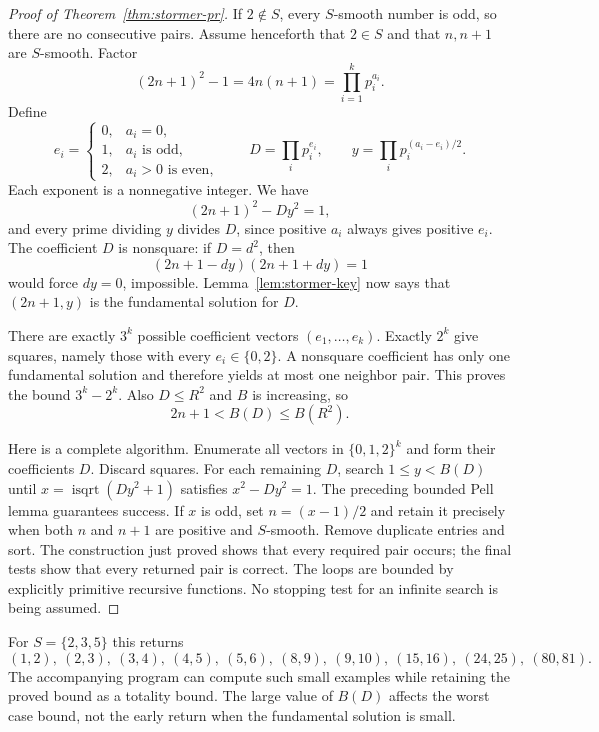 \begin{proof}[Proof of Theorem~\ref{thm:stormer-pr}]
If $2\notin S$, every $S$-smooth number is odd, so there are no consecutive
pairs.  Assume henceforth that $2\in S$ and that $n,n+1$ are $S$-smooth.
Factor
\[
             (2n+1)^2-1=4n(n+1)=\prod_{i=1}^k p_i^{a_i}.
\]
Define
\[
 e_i=\begin{cases}
 0,&a_i=0,\\
 1,&a_i\text{ is odd},\\
 2,&a_i>0\text{ is even},
 \end{cases}
 \qquad
 D=\prod_i p_i^{e_i},\qquad
 y=\prod_i p_i^{(a_i-e_i)/2}.
\]
Each exponent is a nonnegative integer.  We have
\[
 (2n+1)^2-Dy^2=1,
\]
and every prime dividing $y$ divides $D$, since positive $a_i$ always gives
positive $e_i$.  The coefficient $D$ is nonsquare: if $D=d^2$, then
\[
 (2n+1-dy)(2n+1+dy)=1
\]
would force $dy=0$, impossible.  Lemma~\ref{lem:stormer-key} now says that
$(2n+1,y)$ is the fundamental solution for $D$.

There are exactly $3^k$ possible coefficient vectors $(e_1,\ldots,e_k)$.
Exactly $2^k$ give squares, namely those with every $e_i\in\{0,2\}$.
A nonsquare coefficient has only one fundamental solution and therefore yields
at most one neighbor pair.  This proves the bound $3^k-2^k$.
Also $D\le R^2$ and $B$ is increasing, so
\[
                 2n+1<B(D)\le B(R^2).
\]

Here is a complete algorithm.  Enumerate all vectors in $\{0,1,2\}^k$ and
form their coefficients $D$.  Discard squares.  For each remaining $D$, search
$1\le y<B(D)$ until $x=\operatorname{isqrt}(Dy^2+1)$ satisfies
$x^2-Dy^2=1$.  The preceding bounded Pell lemma guarantees success.
If $x$ is odd, set $n=(x-1)/2$ and retain it precisely when both $n$ and $n+1$
are positive and $S$-smooth.  Remove duplicate entries and sort.
The construction just proved shows that every required pair occurs;
the final tests show that every returned pair is correct.  The loops are bounded
by explicitly primitive recursive functions.  No stopping test for an infinite
search is being assumed.
\end{proof}

For $S=\{2,3,5\}$ this returns
\[
 (1,2),\ (2,3),\ (3,4),\ (4,5),\ (5,6),\ (8,9),\ (9,10),
 \ (15,16),\ (24,25),\ (80,81).
\]
The accompanying program can compute such small examples while retaining the
proved bound as a totality bound.  The large value of $B(D)$ affects the worst
case bound, not the early return when the fundamental solution is small.

